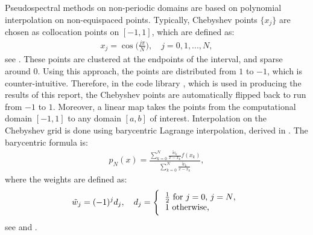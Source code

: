 Pseudospectral methods on non-periodic domains are based on polynomial interpolation on non-equispaced points.  
Typically, Chebyshev points $\{x_j\}$ are chosen as collocation points on $[-1,1]$, which are defined as:
\begin{align}\label{defChebyshevPoints}
x_j= \cos\bigg(\frac{j \pi}{N}\bigg), \quad j=0,1,...,N,
\end{align}	
see \cite{bibTrefethen}.
These points are clustered at the endpoints of the interval, and sparse around $0$. Using this approach, the points are distributed from $1$ to $-1$, which is counter-intuitive. Therefore, in the code library \cite{GoddardPseudospectralCode1}, which is used in producing the results of this report, the Chebyshev points are automatically flipped back to run from $-1$ to $1$. Moreover, a linear map takes the points from the computational domain $[-1,1]$ to any domain $[a,b]$ of interest.
Interpolation on the Chebyshev grid is done using barycentric Lagrange interpolation, derived in \cite{bibTrefethenBerrut1}. The barycentric formula is:
\begin{align*}
p_N(x)= \frac{\displaystyle \sum_{k=0}^N \frac{\tilde w_k}{x-x_k}f(x_k)}{\displaystyle \sum_{k=0}^N \frac{\tilde w_k}{x-x_k}},
\end{align*}
where the weights are defined as:
\begin{align*}
\tilde w_j = (-1)^j d_j, \quad d_j = 
\left \{
\begin{tabular}{c}
$\frac{1}{2}$ \text{for} $j=0$, $j=N$, \\
$1$ \text{otherwise}, \phantom{abksla} 
\end{tabular}
\right .
\end{align*}
see \cite{bibTrefethenBerrut1} and \cite{GoddardPseudospectralCode1}.

